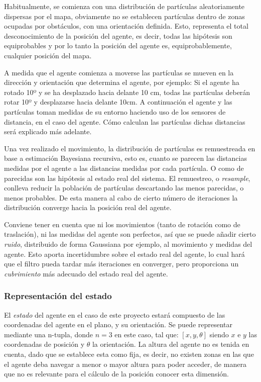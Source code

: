 Habitualmente, se comienza con una distribución de partículas aleatoriamente dispersas por el mapa, obviamente no se establecen partículas dentro de zonas ocupadas por obstáculos, con una orientación definida. Esto, representa el total desconocimiento de la posición del agente, es decir, todas las hipótesis son equiprobables y por lo tanto la posición del agente es, equiprobablemente, cualquier posición del mapa.

A medida que el agente comienza a  moverse las partículas se mueven en la dirección y orientación que determina el agente, por ejemplo: Si el agente ha rotado 10º y se ha desplazado hacia delante 10 cm, todas las partículas deberán rotar 10º y desplazarse hacia delante 10cm. 
A continuación el agente y las partículas toman medidas de su entorno haciendo uso de los sensores de distancia, en el caso del agente. Cómo calculan las partículas dichas distancias será explicado más adelante.

Una vez realizado el movimiento, la distribución de partículas es remuestreada en base a estimación Bayesiana recursiva, esto es, cuanto se parecen las distancias medidas por el agente a las distancias medidas por cada partícula. O como de parecidas son las hipótesis al estado real del sistema.
El remuestreo, o \textit{resample}, conlleva reducir la población de partículas descartando las menos parecidas, o menos probables. De esta manera al cabo de cierto número de iteraciones la distribución converge hacia la posición real del agente. 

Conviene tener en cuenta que ni los movimientos (tanto de rotación como de traslación), ni las medidas del agente son perfectos, así que se puede añadir cierto \textit{ruido}, distribuido de forma Gaussiana por ejemplo, al movimiento y medidas del agente.
Esto aporta incertidumbre sobre el estado real del agente, lo cual hará que el filtro pueda tardar más iteraciones en converger, pero proporciona un \textit{cubrimiento} más adecuado del estado real del agente.

\subsubsection{Representación del estado}
El \textit{estado} del agente en el caso de este proyecto estará compuesto de las coordenadas del agente en el plano, y su orientación. Se puede representar mediante una n-tupla, donde $n=3$ en este caso, tal que: $[x, y, \theta]$ siendo $x$ e $y$ las coordenadas de posición y $\theta$ la orientación. La altura del agente no es tenida en cuenta, dado que se establece esta como fija, es decir, no existen zonas en las que el agente deba navegar a menor o mayor altura para poder acceder, de manera que no es relevante para el cálculo de la posición conocer esta dimensión.

